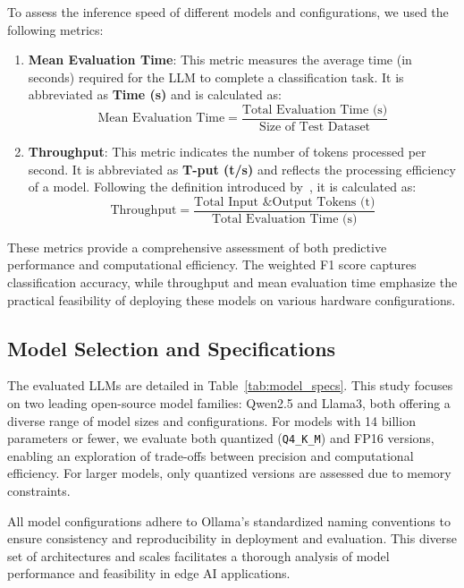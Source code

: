 \documentclass[conference]{IEEEtran}
\begin{document}
To assess the inference speed of different models and configurations, we used the following metrics:

\begin{enumerate}
    \item \textbf{Mean Evaluation Time}: This metric measures the average time (in seconds) required for the LLM to complete a classification task. It is abbreviated as \textbf{Time (s)} and is calculated as:
    \[
    \text{Mean Evaluation Time} = \frac{\text{Total Evaluation Time (s)}}{\text{Size of Test Dataset}}
    \]

    \item \textbf{Throughput}: This metric indicates the number of tokens processed per second. It is abbreviated as \textbf{T-put (t/s)} and reflects the processing efficiency of a model. Following the definition introduced by~\cite{chitty2024llm}, it is calculated as:
    \[
    \text{Throughput} = \frac{\text{Total Input \& Output Tokens (t)}}{\text{Total Evaluation Time (s)}}
    \]
\end{enumerate}

These metrics provide a comprehensive assessment of both predictive performance and computational efficiency. The weighted F1 score captures classification accuracy, while throughput and mean evaluation time emphasize the practical feasibility of deploying these models on various hardware configurations.


\subsection{Model Selection and Specifications}

The evaluated LLMs are detailed in Table~\ref{tab:model_specs}. This study focuses on two leading open-source model families: Qwen2.5 and Llama3, both offering a diverse range of model sizes and configurations. For models with 14 billion parameters or fewer, we evaluate both quantized (\texttt{Q4\_K\_M}) and FP16 versions, enabling an exploration of trade-offs between precision and computational efficiency. For larger models, only quantized versions are assessed due to memory constraints. 

All model configurations adhere to Ollama's standardized naming conventions to ensure consistency and reproducibility in deployment and evaluation. This diverse set of architectures and scales facilitates a thorough analysis of model performance and feasibility in edge AI applications.
\end{document}

